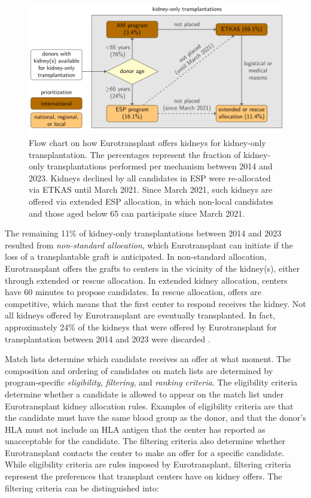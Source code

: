 \documentclass[11pt,twoside,]{book}
\begin{document}
\begin{figure}[h]

{\centering \includegraphics[width=0.96\linewidth]{figures/ch8//fig1-flowchart_kidney_allocation} 

}

\caption{Flow chart on how Eurotransplant offers kidneys for kidney-only transplantation. The percentages represent the fraction of kidney-only transplantations performed per mechanism between 2014 and 2023. Kidneys declined by all candidates in ESP were re-allocated via ETKAS until March 2021. Since March 2021, such kidneys are offered via extended ESP allocation, in which non-local candidates and those aged below 65 can participate since March 2021.}\label{fig:ch8fig1}
\end{figure}

The remaining 11\% of kidney-only transplantations between 2014 and 2023
resulted from \emph{non-standard allocation}, which Eurotransplant can initiate
if the loss of a transplantable graft is anticipated. In non-standard allocation,
Eurotransplant offers the grafts to centers in the vicinity of the kidney(s),
either through extended or rescue allocation. In extended kidney allocation, centers
have 60 minutes to propose candidates. In rescue allocation, offers are competitive,
which means that the first center to respond receives the kidney. Not all kidneys offered by
Eurotransplant are eventually transplanted.
In fact, approximately 24\% of the kidneys that were offered by Eurotransplant
for transplantation between 2014 and 2023 were discarded \citep{etreport_1132P}.

Match lists determine which candidate receives an offer at
what moment. The composition and ordering of
candidates on match lists are determined by program-specific
\emph{eligibility}, \emph{filtering}, and \emph{ranking criteria}. The eligibility
criteria determine whether a candidate is allowed to appear on the match list
under Eurotransplant kidney allocation rules. Examples of eligibility criteria are that the
candidate must have the same blood group as the donor, and that the donor's HLA
must not include an HLA antigen that the center has reported as unacceptable for
the candidate.
\newpage
The filtering criteria also determine whether Eurotransplant contacts
the center to make an offer for a specific candidate. While eligibility criteria
are rules imposed by Eurotransplant, filtering criteria represent the preferences
that transplant centers have on kidney offers.
The filtering criteria can be distinguished into:
\end{document}
